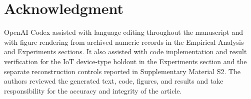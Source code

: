 \documentclass[journal]{IEEEtran}
\begin{document}
\section*{Acknowledgment}
OpenAI Codex assisted with language editing throughout the manuscript and with figure rendering from archived numeric records in the Empirical Analysis and Experiments sections. It also assisted with code implementation and result verification for the IoT device-type holdout in the Experiments section and the separate reconstruction controls reported in Supplementary Material S2. The authors reviewed the generated text, code, figures, and results and take responsibility for the accuracy and integrity of the article.



\end{document}
